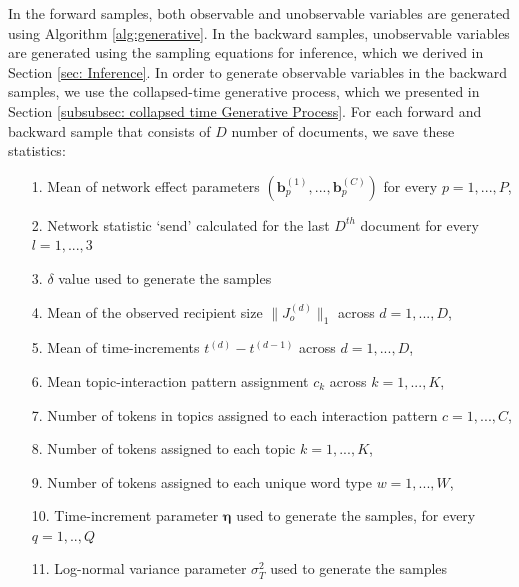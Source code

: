 In the forward samples, both observable and unobservable variables are generated using Algorithm \ref{alg:generative}. In the backward samples, unobservable variables are generated using the sampling equations for inference, which we derived in Section \ref{sec: Inference}. In order to generate observable variables in the backward samples, we use the collapsed-time generative process, which we presented in Section \ref{subsubsec: collapsed time Generative Process}. For each forward and backward sample that consists of $D$ number of documents, we save these statistics:
      \begin{itemize}
      	\item[1.] Mean of network effect parameters $(\boldsymbol{b}_p^{(1)},...,\boldsymbol{b}_p^{(C)})$ for every $p = 1,...,P$,
      	      	\item[2.] Network statistic `send' calculated for the last $D^{th}$ document for every $l=1,...,3$
      	      	\item[3.] $\delta$ value used to generate the samples
      	      	\item[4.] Mean of the observed recipient size $ \lVert J_o^{(d)} \rVert_1 $ across $d=1,...,D$,
      	\item[5.] Mean of time-increments $t^{(d)}-t^{(d-1)}$ across $d=1,...,D$,
      	\item[6.] Mean topic-interaction pattern assignment $c_k$ across $k=1,...,K$, 
      	\item[7.] Number of tokens in topics assigned to each interaction pattern $c=1,...,C$,
      	\item[8.] Number of tokens assigned to each topic $k=1,...,K$, 
       \item[9.] Number of tokens assigned to each unique word type $w=1,...,W$,
         \item[10.] Time-increment parameter $\boldsymbol{\eta}$ used to generate the samples, for every $q=1,..,Q$
         \item[11.] Log-normal variance parameter $\sigma_T^2$ used to generate the samples
      	      \end{itemize}
      	      
